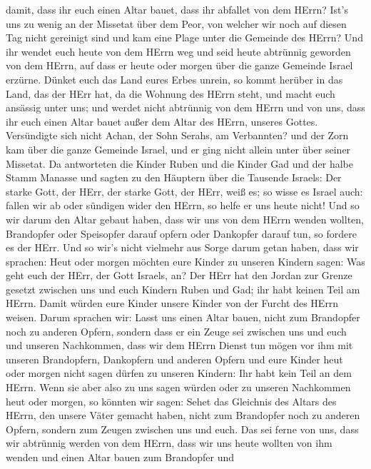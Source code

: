 damit, dass ihr euch einen Altar bauet, dass ihr abfallet von dem HErrn?
 Ist's uns zu wenig an der Missetat über dem Peor, von
welcher wir noch auf diesen Tag nicht gereinigt sind und kam eine Plage
unter die Gemeinde des HErrn?  Und ihr wendet euch heute
von dem HErrn weg und seid heute abtrünnig geworden von dem HErrn, auf
dass er heute oder morgen über die ganze Gemeinde Israel erzürne.
 Dünket euch das Land eures Erbes unrein, so kommt herüber
in das Land, das der HErr hat, da die Wohnung des HErrn steht, und macht
euch ansässig unter uns; und werdet nicht abtrünnig von dem HErrn und
von uns, dass ihr euch einen Altar bauet außer dem Altar des HErrn,
unseres Gottes.  Versündigte sich nicht Achan, der Sohn
Serahs, am Verbannten? und der Zorn kam über die ganze Gemeinde Israel,
und er ging nicht allein unter über seiner Missetat.  Da
antworteten die Kinder Ruben und die Kinder Gad und der halbe Stamm
Manasse und sagten zu den Häuptern über die Tausende Israels:
 Der starke Gott, der HErr, der starke Gott, der HErr, weiß
es; so wisse es Israel auch: fallen wir ab oder sündigen wider den
HErrn, so helfe er uns heute nicht!  Und so wir darum den
Altar gebaut haben, dass wir uns von dem HErrn wenden wollten,
Brandopfer oder Speisopfer darauf opfern oder Dankopfer darauf tun, so
fordere es der HErr.  Und so wir's nicht vielmehr aus Sorge
darum getan haben, dass wir sprachen: Heut oder morgen möchten eure
Kinder zu unseren Kindern sagen: Was geht euch der HErr, der Gott
Israels, an?  Der HErr hat den Jordan zur Grenze gesetzt
zwischen uns und euch Kindern Ruben und Gad; ihr habt keinen Teil am
HErrn. Damit würden eure Kinder unsere Kinder von der Furcht des HErrn
weisen.  Darum sprachen wir: Lasst uns einen Altar bauen,
nicht zum Brandopfer noch zu anderen Opfern,  sondern dass
er ein Zeuge sei zwischen uns und euch und unseren Nachkommen, dass wir
dem HErrn Dienst tun mögen vor ihm mit unseren Brandopfern, Dankopfern
und anderen Opfern und eure Kinder heut oder morgen nicht sagen dürfen
zu unseren Kindern: Ihr habt kein Teil an dem HErrn.  Wenn
sie aber also zu uns sagen würden oder zu unseren Nachkommen heut oder
morgen, so könnten wir sagen: Sehet das Gleichnis des Altars des HErrn,
den unsere Väter gemacht haben, nicht zum Brandopfer noch zu anderen
Opfern, sondern zum Zeugen zwischen uns und euch.  Das sei
ferne von uns, dass wir abtrünnig werden von dem HErrn, dass wir uns
heute wollten von ihm wenden und einen Altar bauen zum Brandopfer und
